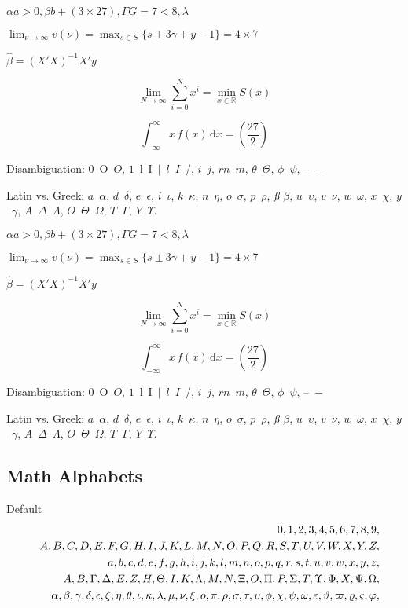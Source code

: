 \documentclass[12pt, a4paper, oneside]{article}
\newcommand{\mathup}[1]{\mathrm{#1}}
\theoremstyle{Plain}
\theoremstyle{Definition}
\theoremstyle{Remark}
\begin{document}
\begin{appendix}
\noindent%
{\sffamily%
$\alpha a > 0, \beta b + (3 \times 27), \Gamma G = 7 < 8, \lambda$

$\lim_{\nu \to \infty} v(\nu) = \max_{s \in S} \{s \pm 3 \gamma + y - 1\} = 4 \times 7$

$\hat{\beta} = (X'X)^{-1}X'y$

$$\lim_{N \to \infty} \sum_{i=0}^{N} x^i = \min_{x \in \mathbb{R}} S(x)$$

$$\int_{-\infty}^{\infty} x\,f(x)\,\mathup{d}x = \left( \frac{27}{2} \right)$$

Disambiguation: $0$~O~$O$, $1$~l~I~$|$~$l$~$I$~$/$, $i$~$j$, $rn$~$m$, $\theta$~$\Theta$, $\phi$~$\psi$, --~$-$

Latin vs. Greek: $a$~$\alpha$, $d$~$\delta$, $e$~$\epsilon$, $i$~$\iota$, $k$~$\kappa$, $n$~$\eta$, $o$~$\sigma$, $p$~$\rho$, \textit{\ss} $\beta$, $u$~$\upsilon$, $v$~$\nu$, $w$~$\omega$, $x$~$\chi$, $y$~$\gamma$, $A$~$\Delta$~$\Lambda$, $O$~$\Theta$~$\Omega$, $T$~$\Gamma$, $Y$~$\Upsilon$.
}

\noindent%
{\sffamily\bfseries%
$\alpha a > 0, \beta b + (3 \times 27), \Gamma G = 7 < 8, \lambda$

$\lim_{\nu \to \infty} v(\nu) = \max_{s \in S} \{s \pm 3 \gamma + y - 1\} = 4 \times 7$

$\hat{\beta} = (X'X)^{-1}X'y$

$$\lim_{N \to \infty} \sum_{i=0}^{N} x^i = \min_{x \in \mathbb{R}} S(x)$$

$$\int_{-\infty}^{\infty} x\,f(x)\,\mathup{d}x = \left( \frac{27}{2} \right)$$

Disambiguation: $0$~O~$O$, $1$~l~I~$|$~$l$~$I$~$/$, $i$~$j$, $rn$~$m$, $\theta$~$\Theta$, $\phi$~$\psi$, --~$-$

Latin vs. Greek: $a$~$\alpha$, $d$~$\delta$, $e$~$\epsilon$, $i$~$\iota$, $k$~$\kappa$, $n$~$\eta$, $o$~$\sigma$, $p$~$\rho$, \textit{\ss} $\beta$, $u$~$\upsilon$, $v$~$\nu$, $w$~$\omega$, $x$~$\chi$, $y$~$\gamma$, $A$~$\Delta$~$\Lambda$, $O$~$\Theta$~$\Omega$, $T$~$\Gamma$, $Y$~$\Upsilon$.
}


\subsection{Math Alphabets \showfamily}
\label{app:math-test:alphabets}


Default
\def\test#1{#1,}
\begin{eqnarray*}
  && {\testnums}\\
  && {\testupper}\\
  && {\testlower}\\
  && {\testupgreek}\\
  && {\testlowgreek}
\end{eqnarray*}%


\end{appendix}
\end{document}
